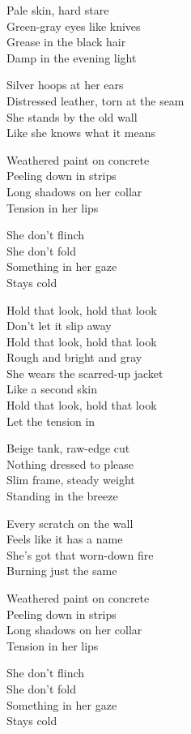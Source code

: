 \begin{lyrics}
Pale skin, hard stare\\
Green-gray eyes like knives\\
Grease in the black hair\\
Damp in the evening light

Silver hoops at her ears\\
Distressed leather, torn at the seam\\
She stands by the old wall\\
Like she knows what it means

Weathered paint on concrete\\
Peeling down in strips\\
Long shadows on her collar\\
Tension in her lips

She don’t flinch\\
She don’t fold\\
Something in her gaze\\
Stays cold

Hold that look, hold that look\\
Don’t let it slip away\\
Hold that look, hold that look\\
Rough and bright and gray\\
She wears the scarred-up jacket\\
Like a second skin\\
Hold that look, hold that look\\
Let the tension in

Beige tank, raw-edge cut\\
Nothing dressed to please\\
Slim frame, steady weight\\
Standing in the breeze

Every scratch on the wall\\
Feels like it has a name\\
She’s got that worn-down fire\\
Burning just the same

Weathered paint on concrete\\
Peeling down in strips\\
Long shadows on her collar\\
Tension in her lips

She don’t flinch\\
She don’t fold\\
Something in her gaze\\
Stays cold


\end{lyrics}
